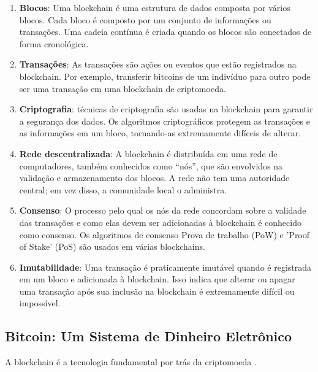 \documentclass[a4paper,12pt]{article}
\newcommand{\printingbibliography}{%

    \pagestyle{myheadings}
    \markright{}
    \sloppy
    \printbibliography[heading=bibintoc, %
                   title=Refer\^encias %
                  ]
    \fussy%
}
\begin{document}
\begin{enumerate}
    \item \textbf{Blocos}: Uma blockchain é uma estrutura de dados composta por vários blocos. Cada bloco é composto 
    por um conjunto de informações ou transações. Uma cadeia contínua é criada quando os blocos são 
    conectados de forma cronológica.

    \item \textbf{Transações}: As transações são ações ou eventos que estão registrados na blockchain. Por exemplo, 
    transferir bitcoins de um indivíduo para outro pode ser uma transação em uma blockchain de criptomoeda.
    
    \item \textbf{Criptografia}: técnicas de criptografia são usadas na blockchain para garantir a segurança dos dados. 
    Os algoritmos criptográficos protegem as transações e as informações em um bloco, tornando-as 
    extremamente difíceis de alterar.

    \item \textbf{Rede descentralizada}: A blockchain é distribuída em uma rede de computadores, também conhecidos 
    como ``nós'', que são envolvidos na validação e armazenamento dos blocos. A rede não tem uma autoridade 
    central; em vez disso, a comunidade local o administra.

    \item \textbf{Consenso}: O processo pelo qual os nós da rede concordam sobre a validade das transações e 
    como elas devem ser adicionadas à blockchain é conhecido como consenso. Os algoritmos de consenso 
    Prova de trabalho (PoW) e 'Proof of Stake' (PoS) são usados em várias blockchains.

    \item \textbf{Imutabilidade}: Uma transação é praticamente imutável quando é registrada em um bloco e 
    adicionada à blockchain. Isso indica que alterar ou apagar uma transação após sua inclusão 
    na blockchain é extremamente difícil ou impossível.
\end{enumerate}

\subsection{Bitcoin: Um Sistema de Dinheiro Eletrônico}

\hspace{0.5cm}A blockchain é a tecnologia fundamental por trás da criptomoeda \btc. 

\printingbibliography
\end{document}

